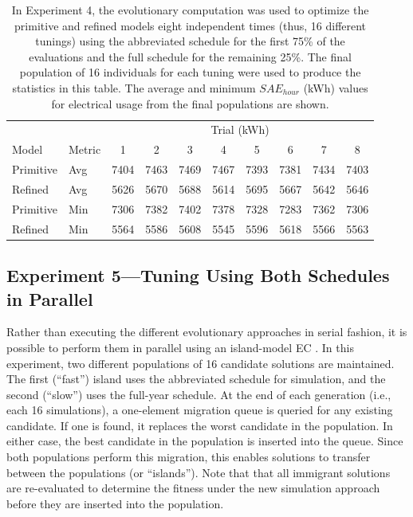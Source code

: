 \documentclass[preprint, review, 12pt]{elsarticle}
\begin{document}
\begin{table}[tbp]
\centering
\caption{In Experiment 4, the evolutionary computation was used to optimize the primitive and refined models eight independent times (thus, 16 different tunings) using the abbreviated schedule for the first 75\% of the evaluations and the full schedule for the remaining 25\%. The final population of 16 individuals for each tuning were used to produce the statistics in this table. The average and minimum $SAE_{hour}$ (kWh) values for electrical usage from the final populations are shown.}
\label{tab:hourly-serial}
\begin{tabular}{llcccccccc}
\toprule
 &  & \multicolumn{8}{c}{Trial (kWh)}\\
Model & Metric & 1 & 2 & 3 & 4 & 5 & 6 & 7 & 8\\
\midrule
Primitive & Avg & 7404 & 7463 & 7469 & 7467 & 7393 & 7381 & 7434 & 7403\\\rowcolor{DarkRow}
Refined   & Avg & 5626 & 5670 & 5688 & 5614 & 5695 & 5667 & 5642 & 5646\\
Primitive & Min & 7306 & 7382 & 7402 & 7378 & 7328 & 7283 & 7362 & 7306\\\rowcolor{DarkRow}
Refined   & Min & 5564 & 5586 & 5608 & 5545 & 5596 & 5618 & 5566 & 5563\\
\bottomrule
\end{tabular}
\end{table}

\subsection{Experiment 5---Tuning Using Both Schedules in Parallel}
\label{sub:experiment5}
Rather than executing the different evolutionary approaches in serial fashion, it is possible to perform them in parallel using an island-model EC \cite{cit:eiben2007}. In this experiment, two different populations of 16 candidate solutions are maintained. The first (``fast'') island uses the abbreviated schedule for simulation, and the second (``slow'') uses the full-year schedule. At the end of each generation (i.e., each 16 simulations), a one-element migration queue is queried for any existing candidate. If one is found, it replaces the worst candidate in the population. In either case, the best candidate in the population is inserted into the queue. Since both populations perform this migration, this enables solutions to transfer between the populations (or ``islands''). Note that that all immigrant solutions are re-evaluated to determine the fitness under the new simulation approach before they are inserted into the population.
\end{document}
